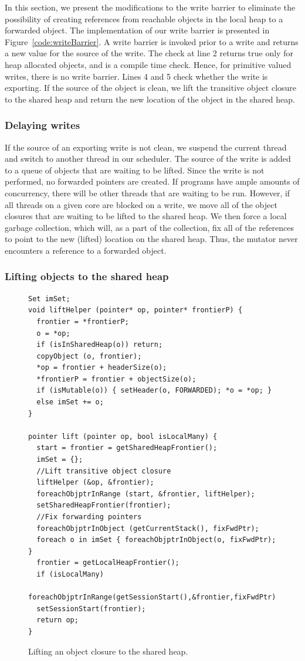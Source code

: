 In this section, we present the modifications to the write barrier to eliminate
the possibility of creating references from reachable objects in the local heap
to a forwarded object. The implementation of our write barrier is presented in
Figure~\ref{code:writeBarrier}. A write barrier is invoked prior to a write and
returns a new value for the source of the write. The check  at
line 2 returns true only for heap allocated objects, and is a compile time
check. Hence, for primitive valued writes, there is no write barrier. Lines 4
and 5 check whether the write is exporting. If the source of the object is
clean, we lift the transitive object closure to the shared heap and return the
new location of the object in the shared heap.

\subsubsection{Delaying writes}

If the source of an exporting write is not clean, we suspend the current thread
and switch to another thread in our scheduler. The source of the write is added
to a queue of objects that are waiting to be lifted. Since the write is not
performed, no forwarded pointers are created. If programs have ample amounts of
concurrency, there will be other threads that are waiting to be run.  However,
if all threads on a given core are blocked on a write, we move all of the
object closures that are waiting to be lifted to the shared heap. We then force
a local garbage collection, which will, as a part of the collection, fix all of
the references to point to the new (lifted) location on the shared heap. Thus,
the mutator never encounters a reference to a forwarded object. \\

\subsubsection{Lifting objects to the shared heap}

\begin{figure}
\begin{lstlisting}
Set imSet;
void liftHelper (pointer* op, pointer* frontierP) {
  frontier = *frontierP;
  o = *op;
  if (isInSharedHeap(o)) return;
  copyObject (o, frontier);
  *op = frontier + headerSize(o);
  *frontierP = frontier + objectSize(o);
  if (isMutable(o)) { setHeader(o, FORWARDED); *o = *op; }
  else imSet += o;
}

pointer lift (pointer op, bool isLocalMany) {
  start = frontier = getSharedHeapFrontier();
  imSet = {};
  //Lift transitive object closure
  liftHelper (&op, &frontier);
  foreachObjptrInRange (start, &frontier, liftHelper);
  setSharedHeapFrontier(frontier);
  //Fix forwarding pointers
  foreachObjptrInObject (getCurrentStack(), fixFwdPtr);
  foreach o in imSet { foreachObjptrInObject(o, fixFwdPtr); }
  frontier = getLocalHeapFrontier();
  if (isLocalMany)
    foreachObjptrInRange(getSessionStart(),&frontier,fixFwdPtr);
  setSessionStart(frontier);
  return op;
}
\end{lstlisting}
\caption{Lifting an object closure to the shared heap.}
\label{code:lift}
\end{figure}


